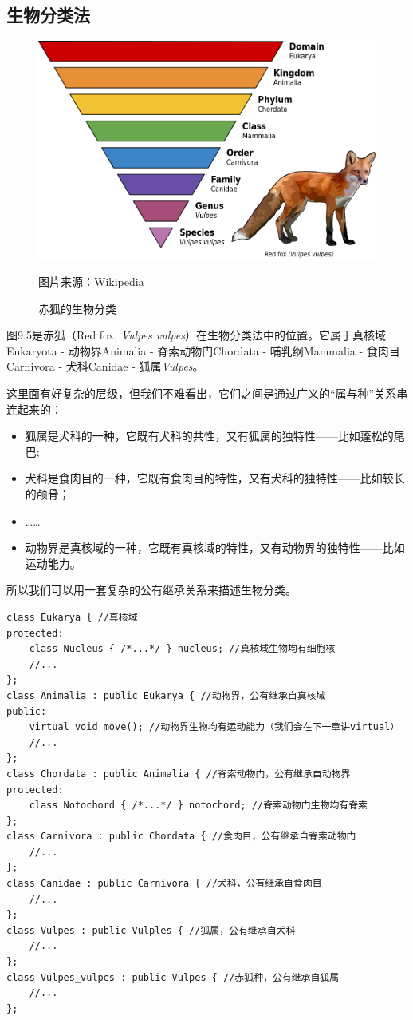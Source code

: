 \subsection*{生物分类法}
\begin{figure}[htbp]
    \centering
    \includegraphics[width=.75\textwidth]{../images/generalized_parts/09_taxonomic_rank_graph_of_red_fox.png}
    \caption{赤狐的生物分类}
    \footnotesize{图片来源：Wikipedia}
\end{figure}
图9.5是赤狐（Red fox, \textit{Vulpes vulpes}）在生物分类法中的位置。它属于真核域Eukaryota - 动物界Animalia - 脊索动物门Chordata - 哺乳纲Mammalia - 食肉目Carnivora - 犬科Canidae - 狐属\textit{Vulpes}。\par
这里面有好复杂的层级，但我们不难看出，它们之间是通过广义的``属与种''关系串连起来的：
\begin{itemize}
    \item 狐属是犬科的一种，它既有犬科的共性，又有狐属的独特性——比如蓬松的尾巴;
    \item 犬科是食肉目的一种，它既有食肉目的特性，又有犬科的独特性——比如较长的颅骨；
    \item ……
    \item 动物界是真核域的一种，它既有真核域的特性，又有动物界的独特性——比如运动能力。
\end{itemize}
所以我们可以用一套复杂的公有继承关系来描述生物分类。
\begin{lstlisting}
class Eukarya { //真核域
protected:
    class Nucleus { /*...*/ } nucleus; //真核域生物均有细胞核
    //...
};
class Animalia : public Eukarya { //动物界，公有继承自真核域
public:
    virtual void move(); //动物界生物均有运动能力（我们会在下一章讲virtual）
    //...
};
class Chordata : public Animalia { //脊索动物门，公有继承自动物界
protected:
    class Notochord { /*...*/ } notochord; //脊索动物门生物均有脊索
};
class Carnivora : public Chordata { //食肉目，公有继承自脊索动物门
    //...
};
class Canidae : public Carnivora { //犬科，公有继承自食肉目
    //...
};
class Vulpes : public Vulples { //狐属，公有继承自犬科
    //...
};
class Vulpes_vulpes : public Vulpes { //赤狐种，公有继承自狐属
    //...
};
\end{lstlisting}
